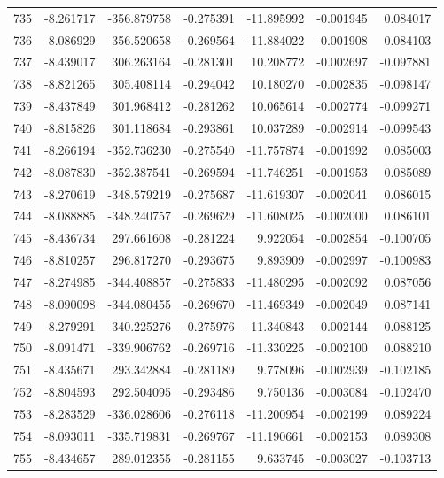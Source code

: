 \begin{tabular}{rrrrrrr}
 735 &  -8.261717 & -356.879758 & -0.275391 & -11.895992 &  -0.001945 &  0.084017 \\
 736 &  -8.086929 & -356.520658 & -0.269564 & -11.884022 &  -0.001908 &  0.084103 \\
 737 &  -8.439017 &  306.263164 & -0.281301 &  10.208772 &  -0.002697 & -0.097881 \\
 738 &  -8.821265 &  305.408114 & -0.294042 &  10.180270 &  -0.002835 & -0.098147 \\
 739 &  -8.437849 &  301.968412 & -0.281262 &  10.065614 &  -0.002774 & -0.099271 \\
 740 &  -8.815826 &  301.118684 & -0.293861 &  10.037289 &  -0.002914 & -0.099543 \\
 741 &  -8.266194 & -352.736230 & -0.275540 & -11.757874 &  -0.001992 &  0.085003 \\
 742 &  -8.087830 & -352.387541 & -0.269594 & -11.746251 &  -0.001953 &  0.085089 \\
 743 &  -8.270619 & -348.579219 & -0.275687 & -11.619307 &  -0.002041 &  0.086015 \\
 744 &  -8.088885 & -348.240757 & -0.269629 & -11.608025 &  -0.002000 &  0.086101 \\
 745 &  -8.436734 &  297.661608 & -0.281224 &   9.922054 &  -0.002854 & -0.100705 \\
 746 &  -8.810257 &  296.817270 & -0.293675 &   9.893909 &  -0.002997 & -0.100983 \\
 747 &  -8.274985 & -344.408857 & -0.275833 & -11.480295 &  -0.002092 &  0.087056 \\
 748 &  -8.090098 & -344.080455 & -0.269670 & -11.469349 &  -0.002049 &  0.087141 \\
 749 &  -8.279291 & -340.225276 & -0.275976 & -11.340843 &  -0.002144 &  0.088125 \\
 750 &  -8.091471 & -339.906762 & -0.269716 & -11.330225 &  -0.002100 &  0.088210 \\
 751 &  -8.435671 &  293.342884 & -0.281189 &   9.778096 &  -0.002939 & -0.102185 \\
 752 &  -8.804593 &  292.504095 & -0.293486 &   9.750136 &  -0.003084 & -0.102470 \\
 753 &  -8.283529 & -336.028606 & -0.276118 & -11.200954 &  -0.002199 &  0.089224 \\
 754 &  -8.093011 & -335.719831 & -0.269767 & -11.190661 &  -0.002153 &  0.089308 \\
 755 &  -8.434657 &  289.012355 & -0.281155 &   9.633745 &  -0.003027 & -0.103713 \\

\end{tabular}
